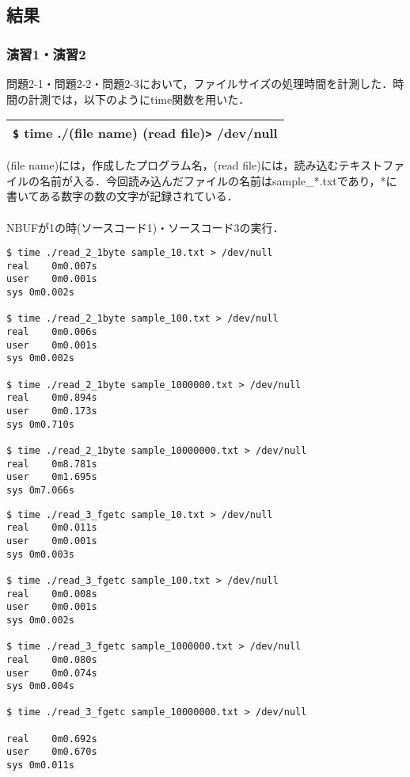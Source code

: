 \documentclass[a4paper,12pt]{jsarticle}
\begin{document}
\subsection{結果}
\subsubsection{演習1・演習2}
問題2-1・問題2-2・問題2-3において，ファイルサイズの処理時間を計測した．時間の計測では，以下のようにtime関数を用いた．
\begin{table}[H]
  \begin{center}
    \begin{tabular}{|p{150mm}|}
      \hline
      \verb|$|  time  ./(file name)  (read file)\verb|>| /dev/null \\
      \hline
    \end{tabular}
  \end{center}
\end{table}
\vspace{-2zh}

(file name)には，作成したプログラム名，(read file)には，読み込むテキストファイルの名前が入る．今回読み込んだファイルの名前はsample\_*.txtであり，*に書いてある数字の数の文字が記録されている．\\
\\
NBUFが1の時(ソースコード1)・ソースコード3の実行．
\begin{lstlisting}[basicstyle=\footnotesize, caption={time\_read\_2\_1byte}, label=read1byte]
$ time ./read_2_1byte sample_10.txt > /dev/null
real	0m0.007s
user	0m0.001s
sys	0m0.002s

$ time ./read_2_1byte sample_100.txt > /dev/null
real	0m0.006s
user	0m0.001s
sys	0m0.002s

$ time ./read_2_1byte sample_1000000.txt > /dev/null
real	0m0.894s
user	0m0.173s
sys	0m0.710s

$ time ./read_2_1byte sample_10000000.txt > /dev/null
real	0m8.781s
user	0m1.695s
sys	0m7.066s
\end{lstlisting}


\begin{lstlisting}[basicstyle=\footnotesize,caption={time\_read\_3\_fgetc}, label=readfgetc]
$ time ./read_3_fgetc sample_10.txt > /dev/null
real	0m0.011s
user	0m0.001s
sys	0m0.003s

$ time ./read_3_fgetc sample_100.txt > /dev/null
real	0m0.008s
user	0m0.001s
sys	0m0.002s

$ time ./read_3_fgetc sample_1000000.txt > /dev/null
real	0m0.080s
user	0m0.074s
sys	0m0.004s

$ time ./read_3_fgetc sample_10000000.txt > /dev/null

real	0m0.692s
user	0m0.670s
sys	0m0.011s
\end{lstlisting}
\end{document}
